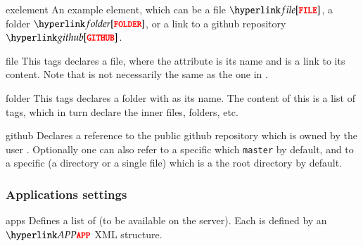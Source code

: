 \bigskip
\xmlstruct
{exelement}
{%
%
  An example element, which can be a file $\xmlstructref{file}$, a
  folder $\xmlstructref{folder}$, or a link to a github repository
  $\xmlstructref{github}$.
%
}
{}%


\bigskip
\xmlstruct
{file}
{%
%
  This tags declares a file, where the  attribute is its
  name and  is a link to its content. Note that  is
  not necessarily the same as the one in .
%
}
{}%

\bigskip
\xmlstruct
{folder}
{%
%
  This tags declares a folder with  as its name. The content
  of this is a list of  tags, which in turn
  declare the inner files, folders, etc.
%
}
{}%


\bigskip
\xmlstruct
{github}
{%
%
  Declares a reference to the public github repository 
  which is owned by the user . Optionally one can also
  refer to a specific  which \texttt{master} by default,
  and to a specific  (a directory or a single file) which is
  a the root directory by default.
%
}
{}%

\subsubsection*{Applications settings}

\bigskip
\xmlstruct
{apps}
{
%
  Defines a list of \apps (to be available on the \ei server). Each
  \app is defined by an $\xmlstructrefwb{APP}$ XML structure.
%
}
{}

